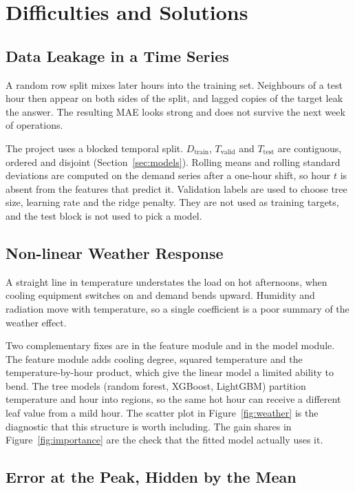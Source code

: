 \section{Difficulties and Solutions}
\label{sec:difficulties}

\subsection{Data Leakage in a Time Series}
\label{sec:leakage}

A random row split mixes later hours into the training set. Neighbours of a
test hour then appear on both sides of the split, and lagged copies of the
target leak the answer. The resulting MAE looks strong and does not survive
the next week of operations.

The project uses a blocked temporal split. \(D_{\mathrm{train}}\),
\(T_{\mathrm{valid}}\) and \(T_{\mathrm{test}}\) are contiguous, ordered and
disjoint (Section~\ref{sec:models}). Rolling means and rolling standard
deviations are computed on the demand series after a one-hour shift, so hour
\(t\) is absent from the features that predict it. Validation labels are used
to choose tree size, learning rate and the ridge penalty. They are not used
as training targets, and the test block is not used to pick a model.

\subsection{Non-linear Weather Response}
\label{sec:nonlinear}

A straight line in temperature understates the load on hot afternoons, when
cooling equipment switches on and demand bends upward. Humidity and radiation
move with temperature, so a single coefficient is a poor summary of the
weather effect.

Two complementary fixes are in the feature module and in the model module.
The feature module adds cooling degree, squared temperature and the
temperature-by-hour product, which give the linear model a limited ability to
bend. The tree models (random forest, XGBoost, LightGBM) partition
temperature and hour into regions, so the same hot hour can receive a
different leaf value from a mild hour. The scatter plot in
Figure~\ref{fig:weather} is the diagnostic that this structure is worth
including. The gain shares in Figure~\ref{fig:importance} are the check that
the fitted model actually uses it.

\subsection{Error at the Peak, Hidden by the Mean}
\label{sec:peak-error}


